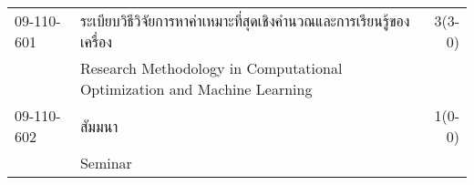 \begin{longtable}{p{}p{}r{}}
09-110-601 & ระเบียบวิธีวิจัยการหาค่าเหมาะที่สุดเชิงคำนวณและการเรียนรู้ของเครื่อง & 3(3-0)\\
& Research Methodology in Computational Optimization and Machine Learning & \\[3mm]
09-110-602 & สัมมนา & 1(0-0)\\
& Seminar & \\[3mm]
\end{longtable}
